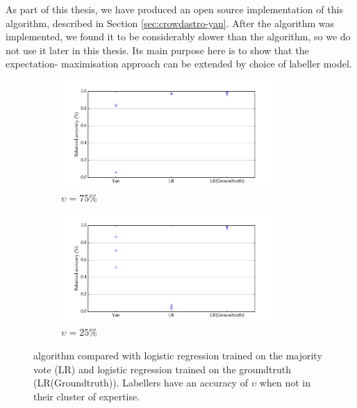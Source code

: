         As part of this thesis, we have produced an open source implementation
        of this algorithm, described in Section \ref{sec:crowdastro-yan}. After
        the algorithm was implemented, we found it to be considerably slower
        than the \citeauthor{raykar10} algorithm, so we do not use it later in
        this thesis. Its main purpose here is to show that the expectation-
        maximisation approach can be extended by choice of labeller model.

        \begin{figure}
            \centering
            \begin{subfigure}{\textwidth}
                \centering
                \includegraphics[width=0.9\textwidth]
                    {images/experiments/yan_25pc_noise.pdf}
                \caption{$\upsilon = 75\%$}
                \label{fig:yan-experiment-low-noise}
            \end{subfigure}
            \begin{subfigure}{\textwidth}
                \centering
                \includegraphics[width=0.9\textwidth]
                    {images/experiments/yan_75pc_noise.pdf}
                \caption{$\upsilon = 25\%$}
                \label{fig:yan-experiment-high-noise}
            \end{subfigure}
            \caption{\citeauthor{yan10} algorithm compared with logistic
                regression trained on the majority vote (LR) and logistic
                regression trained on the groundtruth (LR(Groundtruth)).
                Labellers have an accuracy of $\upsilon$ when not in
                their cluster of expertise.}
        \end{figure}

